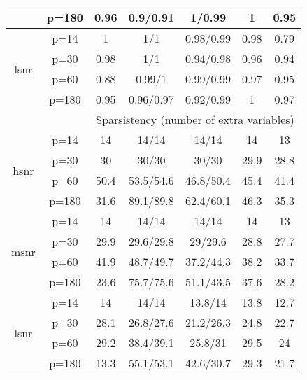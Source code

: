 \begin{table}[ht]
{\begin{tabular}{|c|c|ccccc|}
   & p=180 & 0.96 & 0.9/0.91 & 1/0.99 & 1 & 0.95 \\ 
  \midrule\multirow{4}[2]{*}{lsnr} & p=14 & 1 & 1/1 & 0.98/0.99 & 0.98 & 0.79 \\ 
   & p=30 & 0.98 & 1/1 & 0.94/0.98 & 0.96 & 0.94 \\ 
   & p=60 & 0.88 & 0.99/1 & 0.99/0.99 & 0.97 & 0.95 \\ 
   & p=180 & 0.95 & 0.96/0.97 & 0.92/0.99 & 1 & 0.97 \\ 
   \midrule 
 \multicolumn{1}{|c}{} &       & \multicolumn{5}{c|}{Sparsistency (number of extra variables)} \\
\midrule\multirow{4}[2]{*}{hsnr} & p=14 & 14 & 14/14 & 14/14 & 14 & 13 \\ 
   & p=30 & 30 & 30/30 & 30/30 & 29.9 & 28.8 \\ 
   & p=60 & 50.4 & 53.5/54.6 & 46.8/50.4 & 45.4 & 41.4 \\ 
   & p=180 & 31.6 & 89.1/89.8 & 62.4/60.1 & 46.3 & 35.3 \\ 
  \midrule\multirow{4}[2]{*}{msnr} & p=14 & 14 & 14/14 & 14/14 & 14 & 13 \\ 
   & p=30 & 29.9 & 29.6/29.8 & 29/29.6 & 28.8 & 27.7 \\ 
   & p=60 & 41.9 & 48.7/49.7 & 37.2/44.3 & 38.2 & 33.7 \\ 
   & p=180 & 23.6 & 75.7/75.6 & 51.1/43.5 & 37.6 & 28.2 \\ 
  \midrule\multirow{4}[2]{*}{lsnr} & p=14 & 14 & 14/14 & 13.8/14 & 13.8 & 12.7 \\ 
   & p=30 & 28.1 & 26.8/27.6 & 21.2/26.3 & 24.8 & 22.7 \\ 
   & p=60 & 29.2 & 38.4/39.1 & 25.8/31 & 29.5 & 24 \\ 
   & p=180 & 13.3 & 55.1/53.1 & 42.6/30.7 & 29.3 & 21.7 \\ 
   \bottomrule 
\end{tabular}
}
\end{table}
